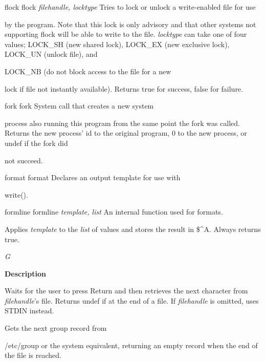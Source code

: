 \documentclass[a4paper,11pt]{book}
\begin{document}
\noindent flock flock \textit{filehandle, locktype }Tries to lock or unlock a write-enabled file for use

\noindent by the program. Note that this lock is only advisory and that other systems not supporting flock will be able to write to the file. \textit{locktype }can take one of four values; LOCK\_SH (new shared lock), LOCK\_EX (new exclusive lock), LOCK\_UN (unlock file), and

\noindent LOCK\_NB (do not block access to the file for a new

\noindent lock if file not instantly available). Returns true for success, false for failure.

\noindent  

\noindent  

\noindent 

\noindent fork fork System call that creates a new system

\noindent process also running this program from the same point the fork was called. Returns the new process' id to the original program, 0 to the new process, or undef if the fork did

\noindent not succeed.

\noindent 

\noindent format format Declares an output template for use with

\noindent write().

\noindent 

\noindent formline formline \textit{template, list }An internal function used for formats.

\noindent Applies \textit{template }to the \textit{list }of values and stores the result in \$\^{}A. Always returns true.

\noindent 

\noindent 

\noindent \textit{G}

\noindent 

\noindent \textbf{Description}

\noindent 

\noindent Waits for the user to press Return and then retrieves the next character from \textit{filehandle}'s file. Returns undef if at the end of a file. If \textit{filehandle }is omitted, uses STDIN instead.

\noindent 

\noindent Gets the next group record from

\noindent /etc/group or the system equivalent, returning an empty record when the end of the file is reached.
\end{document}
